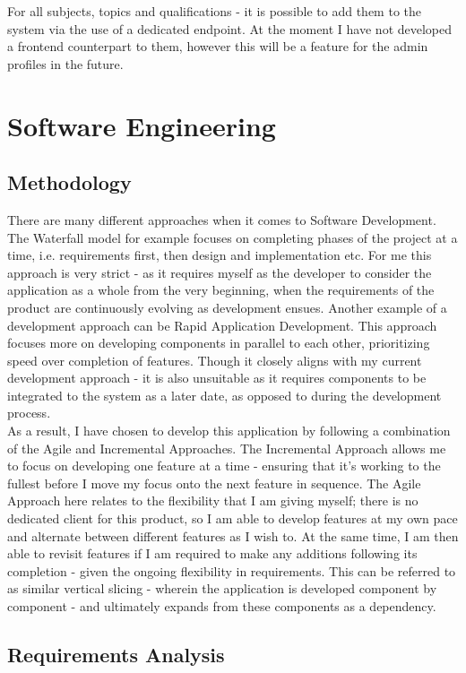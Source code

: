 \documentclass[]{final_report}
\begin{document}
For all subjects, topics and qualifications - it is possible to add them to the system via the use of a dedicated endpoint. At the moment I have not developed a frontend counterpart to them, however this will be a feature for the admin profiles in the future. 

\chapter{Software Engineering}

\section{Methodology}
There are many different approaches when it comes to Software Development. The Waterfall model for example focuses on completing phases of the project at a time, i.e. requirements first, then design and implementation etc. For me this approach is very strict - as it requires myself as the developer to consider the application as a whole from the very beginning, when the requirements of the product are continuously evolving as development ensues. Another example of a development approach can be Rapid Application Development. This approach focuses more on developing components in parallel to each other, prioritizing speed over completion of features. Though it closely aligns with my current development approach - it is also unsuitable as it requires components to be integrated to the system as a later date, as opposed to during the development process.\\

As a result, I have chosen to develop this application by following a combination of the Agile and Incremental Approaches. The Incremental Approach allows me to focus on developing one feature at a time - ensuring that it's working to the fullest before I move my focus onto the next feature in sequence. The Agile Approach here relates to the flexibility that I am giving myself; there is no dedicated client for this product, so I am able to develop features at my own pace and alternate between different features as I wish to. At the same time, I am then able to revisit features if I am required to make any additions following its completion - given the ongoing flexibility in requirements. This can be referred to as similar vertical slicing - wherein the application is developed component by component - and ultimately expands from these components as a dependency.

\section{Requirements Analysis}
\end{document}
